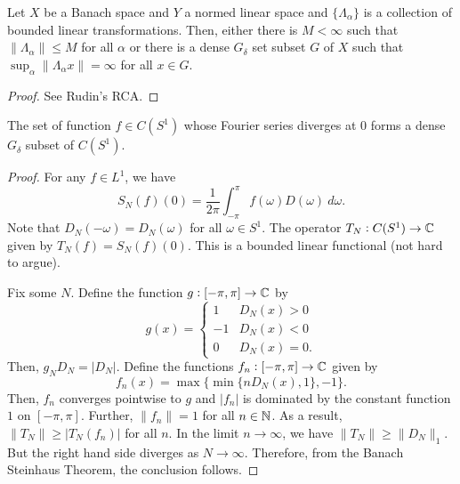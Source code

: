 \begin{theorem}
    Let $X$ be a Banach space and $Y$ a normed linear space and $\{\Lambda_\alpha\}$ is a collection of bounded linear transformations. Then, either there is $M < \infty$ such that $\|\Lambda_\alpha\|\le M$ for all $\alpha$ or there is a dense $G_\delta$ set subset $G$ of $X$ such that $\sup_{\alpha}\|\Lambda_\alpha x\| = \infty$ for all $x\in G$.
\end{theorem}
\begin{proof}
    See Rudin's RCA.
\end{proof}

\begin{theorem}
    The set of function $f\in C(S^1)$ whose Fourier series diverges at $0$ forms a dense $G_\delta$ subset of $C(S^1)$.
\end{theorem}
\begin{proof}
For any $f\in L^1$, we have 
\begin{equation*}
    S_N(f)(0) = \frac{1}{2\pi}\int_{-\pi}^\pi f(\omega)D(\omega)~d\omega.
\end{equation*}
Note that $D_N(-\omega) = D_N(\omega)$ for all $\omega\in S^1$. The operator $T_N: C(S^1)\to\mathbb{C}$ given by $T_N(f) = S_N(f)(0)$. This is a bounded linear functional (not hard to argue). 

Fix some $N$. Define the function $g:[-\pi,\pi]\to\mathbb{C}$ by 
\begin{equation*}
    g(x) = 
    \begin{cases}
        1 & D_N(x) > 0\\
        -1 & D_N(x) < 0\\
        0 & D_N(x) = 0.
    \end{cases}
\end{equation*}
Then, $g_ND_N = |D_N|$. Define the functions $f_n:[-\pi,\pi]\to\mathbb{C}$ given by 
\begin{equation*}
    f_n(x) = \max\{\min\{nD_N(x), 1\}, -1\}.
\end{equation*}
Then, $f_n$ converges pointwise to $g$ and $|f_n|$ is dominated by the constant function $1$ on $[-\pi, \pi]$. Further, $\|f_n\| = 1$ for all $n\in\mathbb{N}$. As a result, $\|T_N\|\ge |T_N(f_n)|$ for all $n$. In the limit $n\to\infty$, we have $\|T_N\|\ge\|D_N\|_{1}$. But the right hand side diverges as $N\to\infty$. Therefore, from the Banach Steinhaus Theorem, the conclusion follows.
\end{proof}